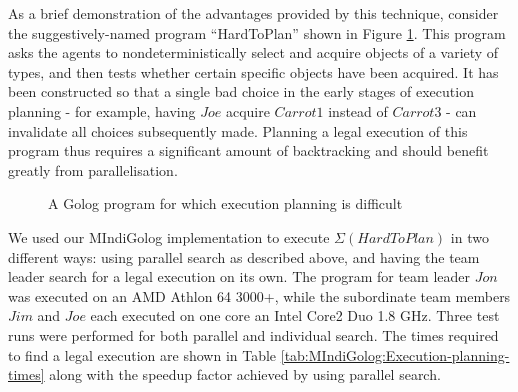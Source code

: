 As a brief demonstration of the advantages provided by this technique,
consider the suggestively-named program {}``HardToPlan'' shown in
Figure \ref{fig:MIndiGolog:HardToPlan}. This program asks the agents
to nondeterministically select and acquire objects of a variety of
types, and then tests whether certain specific objects have been acquired.
It has been constructed so that a single bad choice in the early stages
of execution planning - for example, having $Joe$ acquire $Carrot1$
instead of $Carrot3$ - can invalidate all choices subsequently made.
Planning a legal execution of this program thus requires a significant
amount of backtracking and should benefit greatly from parallelisation.

%
\begin{figure}[!t]
 

\begin{centering}
\par\end{centering}

\caption{A Golog program for which execution planning is difficult\label{fig:MIndiGolog:HardToPlan}}

\end{figure}


We used our MIndiGolog implementation to execute $\Sigma(HardToPlan)$
in two different ways: using parallel search as described above, and
having the team leader search for a legal execution on its own. The
program for team leader $Jon$ was executed on an AMD Athlon 64 3000+,
while the subordinate team members $Jim$ and $Joe$ each executed
on one core an Intel Core2 Duo 1.8 GHz. Three test runs were performed
for both parallel and individual search. The times required to find
a legal execution are shown in Table \ref{tab:MIndiGolog:Execution-planning-times}
along with the speedup factor achieved by using parallel search.

